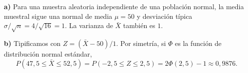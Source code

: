 \textbf{a)} Para una muestra aleatoria independiente de una población normal, la media muestral sigue una normal de media $\mu=50$ y desviación típica $\sigma/\sqrt n=4/\sqrt{16}=1$. La varianza de $\bar X$ también es $1$.

\textbf{b)} Tipificamos con $Z=(\bar X-50)/1$. Por simetría, si $\Phi$ es la función de distribución normal estándar,
\[
P(47{,}5\le\bar X\le52{,}5)=P(-2{,}5\le Z\le2{,}5)
=2\Phi(2{,}5)-1\approx\boxed{0{,}9876}.
\]
